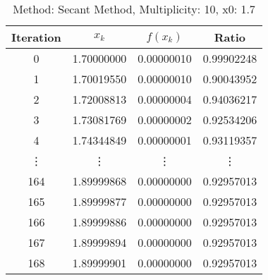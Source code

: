 \begin{table}
\centering
\caption{Method: Secant Method, Multiplicity: 10, x0: 1.7}
\label{tab:table_Secant_Method_10_1_7}
\begin{tabular}{c c c c}
\toprule
Iteration &      $x_k$ &   $f(x_k)$ &      Ratio \\
\midrule
        0 & 1.70000000 & 0.00000010 & 0.99902248 \\
        1 & 1.70019550 & 0.00000010 & 0.90043952 \\
        2 & 1.72008813 & 0.00000004 & 0.94036217 \\
        3 & 1.73081769 & 0.00000002 & 0.92534206 \\
        4 & 1.74344849 & 0.00000001 & 0.93119357 \\
   \vdots &     \vdots &     \vdots &     \vdots \\
      164 & 1.89999868 & 0.00000000 & 0.92957013 \\
      165 & 1.89999877 & 0.00000000 & 0.92957013 \\
      166 & 1.89999886 & 0.00000000 & 0.92957013 \\
      167 & 1.89999894 & 0.00000000 & 0.92957013 \\
      168 & 1.89999901 & 0.00000000 & 0.92957013 \\
\bottomrule
\end{tabular}
\end{table}
